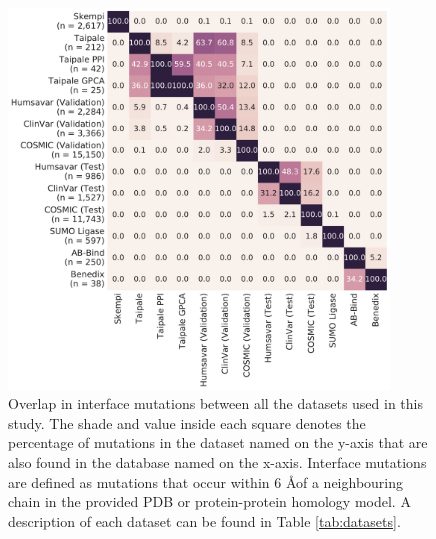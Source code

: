 \begin{figure}[tb]
	\centering
	\includegraphics[width=0.9\textwidth]{static/elaspic_training_set/data_statistics/training_set_overlap_data_df_tt_interface.pdf}
	\caption[Overlap in interface mutation datasets.]{
		Overlap in interface mutations between all the datasets used in this study.
		The shade and value inside each square denotes the percentage of mutations in the dataset named on the y-axis that are also found in the database named on the x-axis.
		Interface mutations are defined as mutations that occur within 6 \AA of a neighbouring chain in the provided PDB or protein-protein homology model.
		A description of each dataset can be found in Table \ref{tab:datasets}.
	}
	\label{fig:training_set_overlap_interface}
\end{figure}
